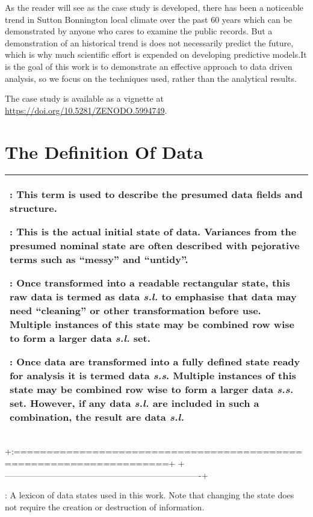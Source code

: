 \documentclass[
]{article}
\begin{document}
As the reader will see as the case study is developed, there has been a
noticeable trend in Sutton Bonnington local climate over the past 60
years which can be demonstrated by anyone who cares to examine the
public records. But a demonstration of an historical trend is does not
necessarily predict the future, which is why much scientific effort is
expended on developing predictive models.It is the goal of this work is
to demonstrate an effective approach to data driven analysis, so we
focus on the techniques used, rather than the analytical results.

The case study is available as a vignette at
\url{https://doi.org/10.5281/ZENODO.5994749}.

\hypertarget{sec:the-definition-of-data-}{%
\section{The Definition Of Data}\label{sec:the-definition-of-data-}}

\hypertarget{fig_terminology_introduction}{}
\begin{longtable}[]{@{}
  >{\raggedright\arraybackslash}p{}@{}}
\toprule
\endhead
: This term is used to describe the \textbf{presumed} data fields and
structure.

: This is the \textbf{actual} initial state of data. Variances from the
presumed nominal state are often described with pejorative terms such as
``messy'' and ``untidy''.

: Once transformed into a readable rectangular state, this raw data is
termed as data \emph{s.l.} to emphasise that data may need ``cleaning''
or other transformation before use. Multiple instances of this state may
be combined row wise to form a larger data \emph{s.l.} set.

: Once data are transformed into a fully defined state ready for
analysis it is termed data \emph{s.s}. Multiple instances of this state
may be combined row wise to form a larger data \emph{s.s.} set. However,
if any data \emph{s.l.} are included in such a combination, the result
are data \emph{s.l.} \\
\bottomrule
\end{longtable}

+:=====================================================================+
+----------------------------------------------------------------------+

: A lexicon of data states used in this work. Note that changing the
state does not require the creation or destruction of information.
\end{document}
